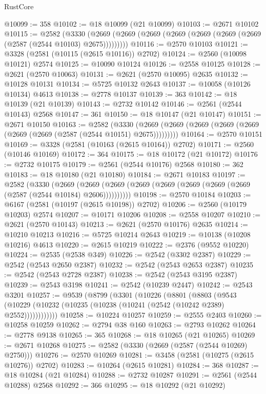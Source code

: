 \begin{lexlean}{RustCore}
\begin{coremodule}
@10099 := 358
@10102 := @18 @10099 (@21 @10099)
@10103 := @2671 @10102
@10115 := @2582
    (@3330 (@2669 (@2669 (@2669 (@2669 (@2669 (@2669 (@2669 (@2587 (@2544 @10103) @2675)))))))))
@10116 := @2570 @10103
@10121 := @3328 (@2581 (@10115 (@2615 @10116)) @2702)
@10124 := @2560 (@10098 @10121) @2574
@10125 := @10090 @10124
@10126 := @2558 @10125
@10128 := @2621 (@2570 @10063)
@10131 := @2621 (@2570 @10095) @2635
@10132 := @10128 @10131
@10134 := @5725 @10132 @2643
@10137 := @10058 (@10126 @10134) @4613
@10138 := @2778 @10137
@10139 := 363
@10142 := @18 @10139 (@21 @10139)
@10143 := @2732 @10142
@10146 := @2561 (@2544 @10143) @2568
@10147 := 361
@10150 := @18 @10147 (@21 @10147)
@10151 := @2671 @10150
@10163 := @2582
    (@3330 (@2669 (@2669 (@2669 (@2669 (@2669 (@2669 (@2669 (@2587 (@2544 @10151) @2675)))))))))
@10164 := @2570 @10151
@10169 := @3328 (@2581 (@10163 (@2615 @10164)) @2702)
@10171 := @2560 (@10146 @10169)
@10172 := 364
@10175 := @18 @10172 (@21 @10172)
@10176 := @2732 @10175
@10179 := @2561 (@2544 @10176) @2568
@10180 := 362
@10183 := @18 @10180 (@21 @10180)
@10184 := @2671 @10183
@10197 := @2582
    (@3330
      (@2669 (@2669 (@2669 (@2669 (@2669 (@2669 (@2669 (@2669 (@2587 (@2544 @10184) @2606))))))))))
@10198 := @2570 @10184
@10203 := @6167 (@2581 (@10197 (@2615 @10198)) @2702)
@10206 := @2560 (@10179 @10203) @2574
@10207 := @10171 @10206
@10208 := @2558 @10207
@10210 := @2621 (@2570 @10143)
@10213 := @2621 (@2570 @10176) @2635
@10214 := @10210 @10213
@10216 := @5725 @10214 @2643
@10219 := @10138 (@10208 @10216) @4613
@10220 := @2615 @10219
@10222 := @2376 (@9552 @10220)
@10224 := @2535 (@2538 @349)
@10226 := @2542 (@3302 @2387)
@10229 := @2542 (@2543 @2650 @2387)
@10232 := @2542 (@2543 @2653 @2387)
@10235 := @2542 (@2543 @2728 @2387)
@10238 := @2542 (@2543 @3195 @2387)
@10239 := @2543 @3198
@10241 := @2542 (@10239 @2447)
@10242 := @2543 @3201
@10257 := @9539
    (@8799
      (@3301
        (@10226
          (@8801
            (@8803
              (@9543 (@10229 (@10232 (@10235 (@10238 (@10241 (@2542 (@10242 @2389) @2552))))))))))))
@10258 := @10224 @10257
@10259 := @2555 @2403
@10260 := @10258 @10259
@10262 := @2794 @38 @160
@10263 := @2793 @10262
@10264 := @2778 @9138
@10265 := 365
@10268 := @18 @10265 (@21 @10265)
@10269 := @2671 @10268
@10275 := @2582 (@3330 (@2669 (@2587 (@2544 @10269) @2750)))
@10276 := @2570 @10269
@10281 := @3458 (@2581 (@10275 (@2615 @10276)) @2702)
@10283 := @10264 (@2615 @10281)
@10284 := 368
@10287 := @18 @10284 (@21 @10284)
@10288 := @2732 @10287
@10291 := @2561 (@2544 @10288) @2568
@10292 := 366
@10295 := @18 @10292 (@21 @10292)

\end{coremodule}
\end{lexlean}

